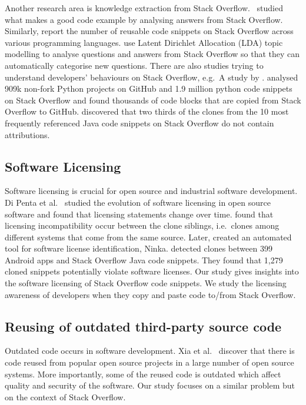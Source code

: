 \documentclass{svjour3}                     %
\begin{document}
Another research area is knowledge extraction from Stack Overflow.
\cite{Nasehi2012}~studied what makes a good code example by analysing answers
from Stack Overflow. Similarly, \cite{Yang2016} report the number of reusable
code snippets on Stack Overflow across various programming languages.
\cite{Wang2013_StackOverflow} use Latent Dirichlet Allocation (LDA) topic
modelling to analyse questions and answers from Stack Overflow so that they can
automatically categorise new questions. There are also studies trying to
understand developers' behaviours on Stack Overflow, e.g.~A study by
\cite{Movshovitz-Attias2013,Rosen2016,Choetkiertikul2015,Bosu2013}.
\cite{Yang2017} analysed 909k non-fork Python projects on GitHub and 1.9 million
python code snippets on Stack Overflow and found thousands of code blocks that
are copied from Stack Overflow to GitHub. \cite{Baltes2017} discovered that two
thirds of the clones from the 10 most frequently referenced Java code snippets on Stack
Overflow do not contain attributions.

\subsection{Software Licensing} Software licensing is crucial for open source
and industrial software development. Di Penta et al.~\cite{DiPenta2010} studied
the evolution of software licensing in open source software and found that
licensing statements change over time. \cite{German2009} found that licensing
incompatibility occur between the clone siblings, i.e.~clones among different systems
that come from the same source. Later, \cite{German2010} created an automated
tool for software license identification, Ninka. \cite{An2017} detected clones
between 399 Android apps and Stack Overflow Java code snippets. They found  that
1,279 cloned snippets potentially violate software licenses. Our study gives
insights into the software licensing of Stack Overflow code snippets. We study
the licensing awareness of developers when they copy and paste code to/from
Stack Overflow.

\subsection{Reusing of outdated third-party source code} Outdated code occurs in
software development. Xia et al.~\cite{Xia2014} discover that there is code
reused from popular open source projects in a large number of open source
systems. More importantly, some of the reused code is outdated which affect
quality and security of the software. Our study focuses on a similar problem but
on the context of Stack Overflow.
\end{document}
